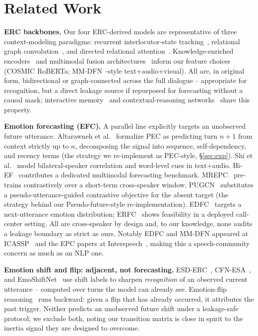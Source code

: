 \documentclass[conference]{IEEEtran}
\begin{document}
\section{Related Work}

\textbf{ERC backbones.} Our four ERC-derived models are representative of three context-modeling
paradigms: recurrent interlocutor-state tracking~\cite{majumder2019dialoguernn}, relational graph
convolution~\cite{ghosal2019dialoguegcn,ai2023dergcn}, and directed relational
attention~\cite{shen2021dagerc}. Knowledge-enriched encoders~\cite{zhong2019ket,ghosal2020cosmic}
and multimodal fusion architectures~\cite{tsai2019mult,hu2021mmgcn,hazarika2020misa,li2023ga2mif,meng2024mglra}
inform our feature choices (COSMIC RoBERTa; MM-DFN~\cite{hu2021mmdfn}-style
text+audio+visual). All are, in original form, bidirectional or graph-connected across the full
dialogue -- appropriate for recognition, but a direct leakage source if repurposed for forecasting
without a causal mask; interactive memory~\cite{hazarika2018icon} and contextual-reasoning
networks~\cite{hu2021dialoguecrn} share this property.

\textbf{Emotion forecasting (EFC).} A parallel line explicitly targets an unobserved future
utterance. Altarawneh et al.~\cite{altarawneh2023pec} formalize PEC as predicting turn $n{+}1$ from
context strictly up to $n$, decomposing the signal into sequence, self-dependency, and recency
terms (the strategy we re-implement as PEC-style, \S\ref{sec:exp}). Shi et
al.~\cite{shi2023epc,shi2024epc} model bilateral-speaker correlation and word-level cues in
text+audio. Hi-EF~\cite{wang2024hief} contributes a dedicated multimodal forecasting benchmark.
MREPC~\cite{ju2023mrepc} pre-trains contrastively over a short-term cross-speaker window.
PUGCN~\cite{xie2025pugcn} substitutes a pseudo-utterance-guided contrastive objective for the
absent target (the strategy behind our Pseudo-future-style re-implementation). EDFC~\cite{lu2023edfc}
targets a next-utterance emotion distribution; ERFC~\cite{debsharma2025erfc} shows feasibility in a
deployed call-center setting. All are cross-speaker by design and, to our knowledge, none audits a
leakage boundary as strict as ours. Notably EDFC and MM-DFN appeared at
ICASSP~\cite{lu2023edfc,hu2021mmdfn} and the EPC papers at Interspeech~\cite{shi2023epc,shi2024epc},
making this a speech-community concern as much as an NLP one.

\textbf{Emotion shift and flip: adjacent, not forecasting.} ESD-ERC~\cite{gao2022esderc},
CFN-ESA~\cite{li2024cfnesa}, and EmoShiftNet~\cite{nirujan2025emoshiftnet} use shift labels to
sharpen \emph{recognition} of an observed current utterance -- computed over turns the model can
already see. Emotion-flip reasoning~\cite{kumar2023efr,kumar2024ediref} runs backward: given a flip
that has already occurred, it attributes the past trigger. Neither predicts an unobserved future
shift under a leakage-safe protocol; we exclude both, noting our transition matrix is close in
spirit to the inertia signal they are designed to overcome.
\end{document}
